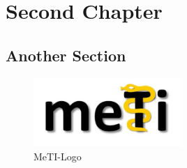 	\chapter{Second Chapter}

	\section{Another Section}

	\begin{figure}[h]
		\centering
		\includegraphics[width=0.5\textwidth]{HSRTReport/Assets/Images/METI.png}
		\caption{MeTI-Logo}
		\label{fig:meti}
	\end{figure}

\fi
